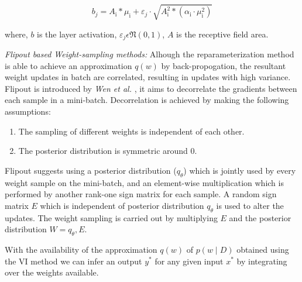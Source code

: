 \documentclass[10pt,twocolumn,letterpaper]{article}
\begin{document}
\begin{equation}b_{j}=A_{\mathrm{i}} * \mu_{\mathrm{i}}+\varepsilon_{j} \cdot \sqrt{A_{\mathrm{i}}^{2} *\left(\alpha_{\mathrm{i}} \cdot \mu_{\mathrm{i}}^{2}\right)}\end{equation}

where, $b$ is the layer activation, $\varepsilon_{j} \epsilon \mathfrak{N}(0,1)$, $ A $ is the receptive field area.

\textit{Flipout based Weight-sampling methods:}
Alhough the reparameterization method is able to achieve an approximation $q(w)$ by back-propogation, the resultant weight updates in batch are correlated, resulting in updates with high variance. Flipout is introduced by \textit{Wen et al.} \cite{Wen2018}, it aims to decorrelate the gradients between each sample in a mini-batch. Decorrelation is achieved by making the following assumptions:
\begin{enumerate}
 \item The sampling of different weights is independent of each other. 
 \item The posterior distribution is symmetric around 0. 
\end{enumerate}

Flipout suggests using a posterior distribution ($q_{\theta}$) which is jointly used by every weight sample on the mini-batch, and an element-wise multiplication which is performed by another rank-one sign matrix for each sample. A random sign matrix $E$ which is independent of posterior distribution $q_{\theta}$ is used to alter the updates. The weight sampling is carried out by multiplying $E$ and the posterior distribution $W = q_{\theta}, E$.

With the availability of the approximation $q(w)$ of $p(w \mid D)$ obtained using the VI method we can infer an output $y^{*}$ for any given input $x^{*}$ by integrating over the weights available.
    
\end{document}
